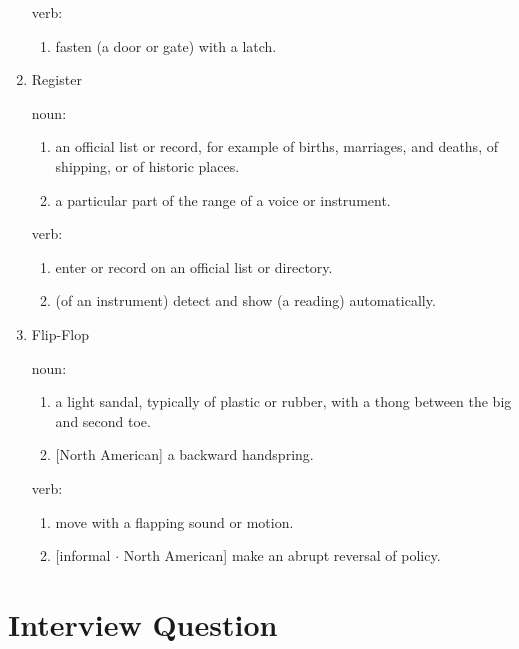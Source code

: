 \documentclass[12pt]{article}
\begin{document}
\begin{enumerate}
    verb:

    \begin{enumerate}
        \item fasten (a door or gate) with a latch.
    \end{enumerate}

    \item{Register}

    noun:

    \begin{enumerate}
        \item an official list or record, for example of births, marriages, and deaths, of shipping, or of historic places.
        \item a particular part of the range of a voice or instrument.
    \end{enumerate}

    verb:

    \begin{enumerate}
        \item enter or record on an official list or directory.
        \item (of an instrument) detect and show (a reading) automatically.
    \end{enumerate}

    \item{Flip-Flop}

    noun:

    \begin{enumerate}
        \item a light sandal, typically of plastic or rubber, with a thong between the big and second toe.
        \item {[North American]} a backward handspring.
    \end{enumerate}

    verb:

    \begin{enumerate}
        \item move with a flapping sound or motion.
        \item {[informal $\cdot$ North American]} make an abrupt reversal of policy.
    \end{enumerate}
\end{enumerate}

\section{Interview Question}
\end{document}
